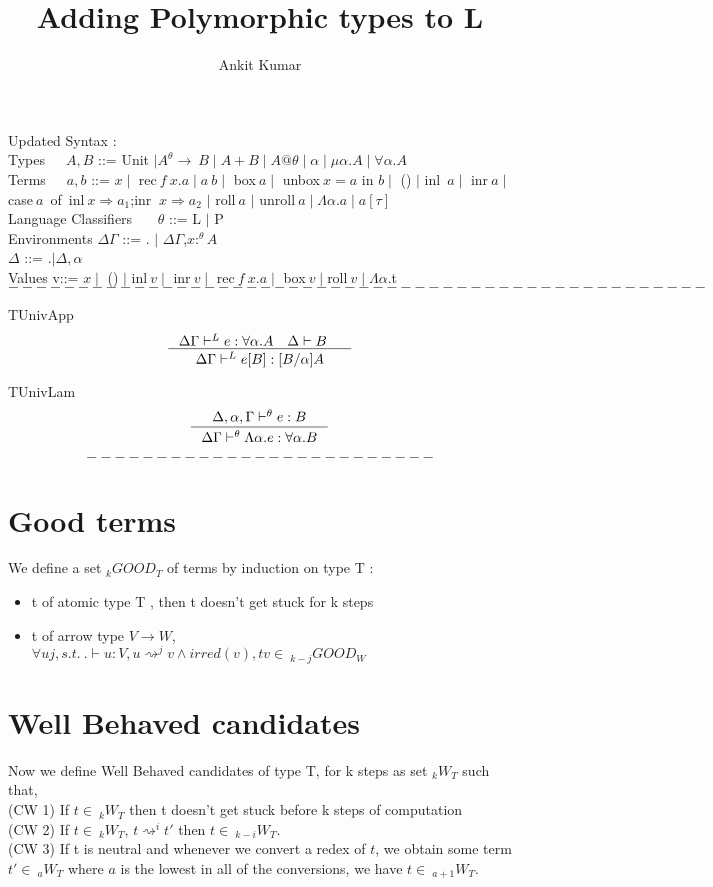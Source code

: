 \documentclass[12pt]{article}
\title{%
  Adding Polymorphic types to L\theta}
\author{Ankit Kumar}
\begin{document}
Updated Syntax :\\

Types\ \ \ $A,B$ ::= Unit $\mid A^{\theta} \rightarrow\ B \mid A+B
\mid A@\theta \mid \alpha \mid \mu \alpha.A \mid \forall \alpha.A$ \\

Terms\ \ \ $a,b$ ::= $x \mid$  rec$\ f\ x.a \mid a\ b \mid$ box$\ a \mid$
unbox$\ x=a$ in $b \mid$ () $\mid$ inl\ $a \mid$ inr$\ a \mid$ case$\ a$\ of\
{inl$\ x \Rightarrow a_1$;inr $\ x \Rightarrow a_2$} $\mid$ roll$\ a$
$\mid$ unroll$\ a \mid \Lambda \alpha.a \mid a[\tau]$  \\

Language Classifiers \ \ \  $\theta$ ::= L $\mid$ P \\

Environments $\Delta\Gamma$ ::= . $\mid $ $\Delta \Gamma$,$x:^{\theta}
A$\\

 \hspace{25 mm}           $ \Delta$   ::=  .$\mid \Delta,\alpha$\\

Values v::= $x \mid $ () $\mid $ inl$\ v \mid $ inr$\ v \mid $ rec$\
f\ x.a \mid $ box$\ v \mid $roll$\ v \mid \Lambda \alpha$.t\\
$$
--------------------------------------------------
$$

TUnivApp
$$
\inference{\Delta\Gamma \vdash^{L} e:\forall \alpha.A \quad \Delta \vdash
B \quad }{\Delta\Gamma \vdash^{L} e[B]:[B/\alpha]A}  
$$

TUnivLam
$$
\inference{\Delta,\alpha,\Gamma \vdash^{\theta} e:B}{\Delta\Gamma
  \vdash^{\theta} \Lambda \alpha.e:\forall \alpha.B}
$$


$$
-------------------------
$$

\section{Good terms}
We define a set $_kGOOD_T$ of terms by induction on type T :
\begin{itemize}
\item t of atomic type T , then t doesn't get stuck for k steps
\item t of arrow type $V \rightarrow W$, $\forall u j,  s.t.\  .\vdash u : V, u
  \rightsquigarrow^j v \wedge irred(v), tv \in\ _{k-j}GOOD_W$
\end{itemize}

\section{Well Behaved candidates}
Now we define Well Behaved candidates of type T, for k steps as set $_kW_T$
such that,\\
(CW 1) If $t \in\  _kW_T$ then t doesn't get stuck before k steps of
computation\\
(CW 2)  If $t \in\  _kW_T$, $t \rightsquigarrow^i t'$ then $t \in\
_{k-i}W_T$.\\
(CW 3) If t is neutral and whenever we convert a redex of $t$, we obtain
some term $t' \in\  _aW_T$ where $a$ is the lowest in all of the
conversions, we have  $t \in\  _{a+1}W_T$.\\
\end{document}
